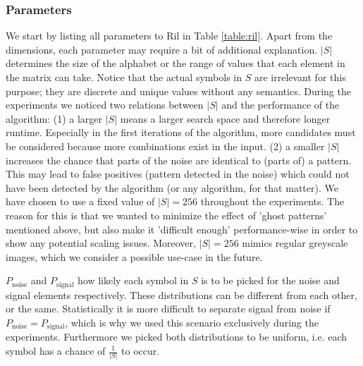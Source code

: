 \documentclass{llncs}
\begin{document}
\subsubsection{Parameters}

We start by listing all parameters to Ril in Table \ref{table:ril}. Apart from the dimensions, each parameter may require a bit of additional explanation. $|S|$ determines the size of the alphabet or the range of values that each element in the matrix can take. Notice that the actual symbols in $S$ are irrelevant for this purpose; they are discrete and unique values without any semantics. During the experiments we noticed two relations between $|S|$ and the performance of the algorithm: (1) a larger $|S|$ means a larger search space and therefore longer runtime. Especially in the first iterations of the algorithm, more candidates must be considered because more combinations exist in the input. (2) a smaller $|S|$ increases the chance that parts of the noise are identical to (parts of) a pattern. This may lead to false positives (pattern detected in the noise) which could not have been detected by the algorithm (or any algorithm, for that matter).  We have chosen to use a fixed value of $|S|=256$ throughout the experiments. The reason for this is that we wanted to minimize the effect of 'ghost patterns' mentioned above, but also make it 'difficult enough' performance-wise in order to show any potential scaling issues. Moreover, $|S|=256$ mimics regular greyscale images, which we consider a possible use-case in the future. 
  
$P_{\mathrm{noise}}$ and $P_{\mathrm{signal}}$ how likely each symbol in $S$ is to be picked for the noise and signal elements respectively. These distributions can be different from each other, or the same. Statistically it is more difficult to separate signal from noise if $P_{\mathrm{noise}} = P_{\mathrm{signal}}$, which is why we used this scenario exclusively during the experiments. Furthermore we picked both distributions to be uniform, i.e. each symbol has a chance of $\frac{1}{|S|}$ to occur.
\end{document}
